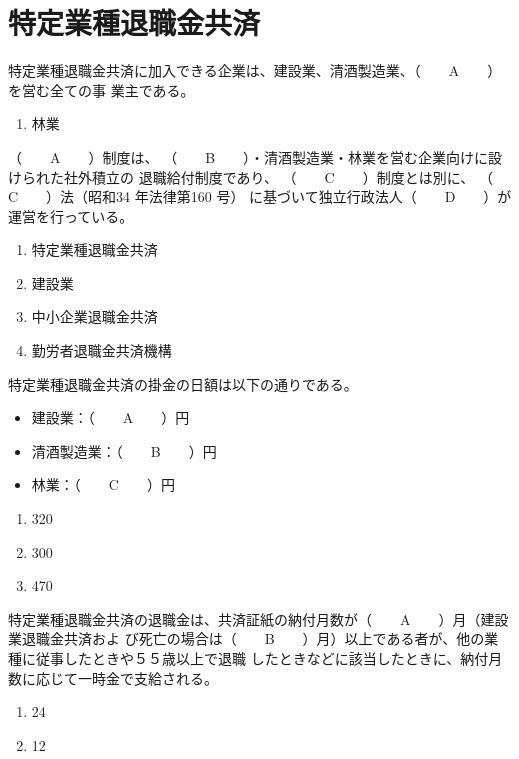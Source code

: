 \section{特定業種退職金共済}

\begin{fillblank}[年金1 2018 問題1(5)\textcircled{4}]
  特定業種退職金共済に加入できる企業は、建設業、清酒製造業、（　　A　　）を営む全ての事
業主である。
\end{fillblank}

\begin{answerbox}
  \begin{enumerate}[A:]
    \item 林業
  \end{enumerate}
\end{answerbox}

\begin{fillblank}[年金1 2023 問題1(6)(ア)]
（　　A　　）制度は、 （　　B　　）・清酒製造業・林業を営む企業向けに設けられた社外積立の
退職給付制度であり、 （　　C　　）制度とは別に、 （　　C　　）法（昭和34 年法律第160 号）
に基づいて独立行政法人（　　D　　）が運営を行っている。
\end{fillblank}

\begin{answerbox}
  \begin{enumerate}[A:]
    \item 特定業種退職金共済
    \item 建設業
    \item 中小企業退職金共済
    \item 勤労者退職金共済機構
  \end{enumerate}
\end{answerbox}

\begin{fillblank}[年金1 2021 問題1(6)\textcircled{3}（改訂）]
  特定業種退職金共済の掛金の日額は以下の通りである。

  \begin{itemize}
    \item 建設業：（　　A　　）円
    \item 清酒製造業：（　　B　　）円
    \item 林業：（　　C　　）円
  \end{itemize}
\end{fillblank}

\begin{answerbox}
  \begin{enumerate}[A:]
    \item 320
    \item 300
    \item 470
  \end{enumerate}
\end{answerbox}

\begin{fillblank}[年金1 2024 問題1(5)ア]
  特定業種退職金共済の退職金は、共済証紙の納付月数が（　　A　　）月（建設業退職金共済およ
び死亡の場合は（　　B　　）月）以上である者が、他の業種に従事したときや５５歳以上で退職
したときなどに該当したときに、納付月数に応じて一時金で支給される。
\end{fillblank}

\begin{answerbox}
  \begin{enumerate}[A:]
    \item 24
    \item 12
  \end{enumerate}
\end{answerbox}

\newpage